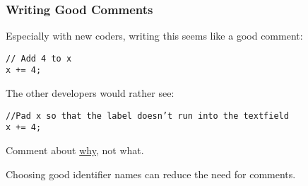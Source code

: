 \begin{frame}
\frametitle{Writing Good Comments}
Especially with new coders, writing this seems like a good comment:

\texttt{// Add 4 to x\\
x += 4;}

The other developers would rather see:

\texttt{//Pad x so that the label doesn't run into the textfield\\
x += 4;}

Comment about \underline{why}, not what.

Choosing good identifier names can reduce the need for comments.

\end{frame}



